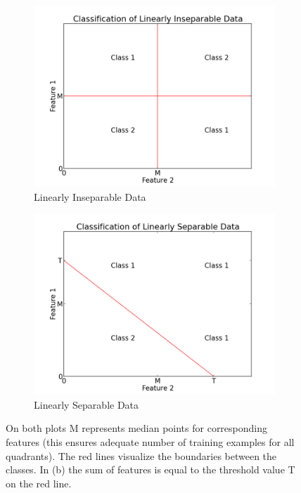\documentclass[12pt,a4paper,notitlepage,twoside]{scrbook}
\begin{document}
\begin{figure}[h]
\begin{subfigure}[b]{0.45\linewidth}
  \includegraphics[width=\linewidth]{figs/gen_insep.png}
  \caption{Linearly Inseparable Data \label{sf:insep}}
\end{subfigure}
\begin{subfigure}[b]{0.45\linewidth}
  \includegraphics[width=1\linewidth]{figs/gen_sep.png}
  \caption{Linearly Separable Data \label{sf:sep}}
\end{subfigure}
\caption{On both plots M represents median points for corresponding features (this ensures
	adequate number of training examples for all quadrants).  The red lines visualize
	the boundaries between the classes.  In (b) the sum of features is equal to the
	threshold value T on the red line.\label{fig:example_probs}}
\end{figure}
\end{document}
